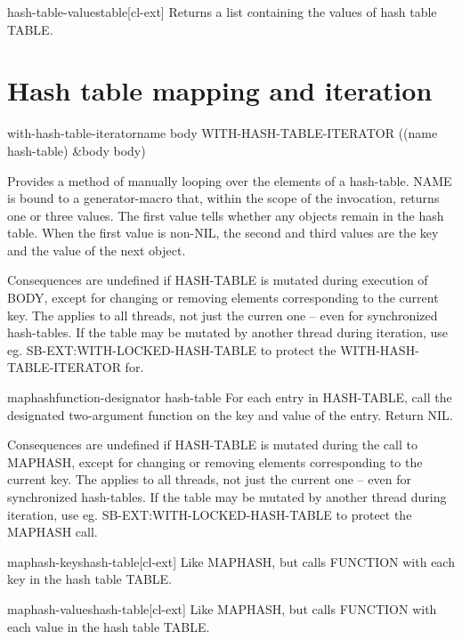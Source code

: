\documentclass[10pt,english]{book}
\begin{document}
\begin{function}{hash-table-values}{table}[cl-ext]
  Returns a list containing the values of hash table TABLE.
\end{function}

\section{Hash table mapping and iteration}
\label{sec:hash-table-mapping}

\begin{macro}{with-hash-table-iterator}{name \body body}
  WITH-HASH-TABLE-ITERATOR ((name hash-table) \&body body)

Provides a method of manually looping over the elements of a hash-table. NAME
is bound to a generator-macro that, within the scope of the invocation,
returns one or three values. The first value tells whether any objects remain
in the hash table. When the first value is non-NIL, the second and third
values are the key and the value of the next object.

Consequences are undefined if HASH-TABLE is mutated during execution of BODY,
except for changing or removing elements corresponding to the current key. The
applies to all threads, not just the curren one -- even for synchronized
hash-tables. If the table may be mutated by another thread during iteration,
use eg. SB-EXT:WITH-LOCKED-HASH-TABLE to protect the WITH-HASH-TABLE-ITERATOR
for.
\end{macro}

\begin{function}{maphash}{function-designator hash-table}
  For each entry in HASH-TABLE, call the designated two-argument function on
the key and value of the entry. Return NIL.

Consequences are undefined if HASH-TABLE is mutated during the call to
MAPHASH, except for changing or removing elements corresponding to the
current key. The applies to all threads, not just the current one --
even for synchronized hash-tables. If the table may be mutated by
another thread during iteration, use eg. SB-EXT:WITH-LOCKED-HASH-TABLE
to protect the MAPHASH call.
\end{function}

\begin{function}{maphash-keys}{hash-table}[cl-ext]
  Like MAPHASH, but calls FUNCTION with each key in the hash table TABLE.
\end{function}

\begin{function}{maphash-values}{hash-table}[cl-ext]
  Like MAPHASH, but calls FUNCTION with each value in the hash table TABLE.
\end{function}
\end{document}

